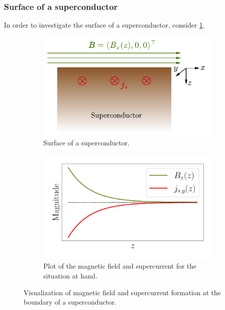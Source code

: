 \documentclass{report}
\numberwithin{tm}{section}
\begin{document}
\subsubsection{Surface of a superconductor}
In order to investigate the surface of a superconductor, consider \cref{fig:superconductor_example}.
\begin{figure}[h]
	\centering
\begin{subfigure}{0.56\textwidth}
	\centering
	\includegraphics[width=\textwidth]{figures/superconductor_example.pdf}
	\caption{Surface of a superconductor.}
	\label{fig:superconductor_example}
\end{subfigure}\hfill
\begin{subfigure}{0.43\textwidth}
	\centering
	\includegraphics[width=\textwidth]{figures/supercurrent_example_plot.pdf}
	\caption{Plot of the magnetic field and supercurrent for the situation at hand.}
	\label{fig:superconductor_example_plot}
\end{subfigure}
\caption{Visualization of magnetic field and supercurrent formation at the boundary of a superconductor.}
\label{fig:superconductor_boundary}
\end{figure}
\end{document}
